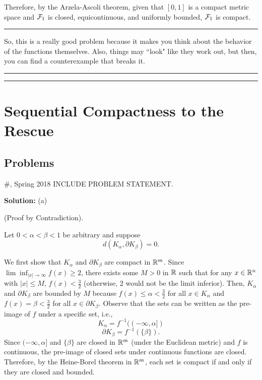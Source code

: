 \documentclass{article}
\begin{document}
	Therefore, by the Arzela-Ascoli theorem, given that $[0,1]$ is a compact metric space and $\mathcal F_1$ is closed, 
	equicontinuous, and uniformly bounded, $\mathcal F_1$ is compact. \\
	
\hrule

So, this is a really good problem because it makes you think about the behavior of the functions themselves. Also, things may ``look" like they work out, but then, you can find a counterexample that breaks it. \\

\hrule \vspace{2pt}
\hrule

\break

\section{Sequential Compactness to the Rescue}

\subsection{Problems}

\begin{problem}{\#, Spring 2018} INCLUDE PROBLEM STATEMENT.

\end{problem}

\textbf{Solution:} (a)

(Proof by Contradiction).

Let $0 < \alpha < \beta < 1$ be arbitrary and suppose 
\[d(K_\alpha,\partial K_\beta) = 0.\]

We first show that $K_\alpha$ and $\partial K_\beta$ are compact in $\mathbb R^m$. Since $\lim\inf_{|x|\to\infty} f(x) \geq 2$, there exists some $M>0$ in $\mathbb R$ such that for any $x\in \mathbb R^n$ with $|x|\leq M$, $f(x) < \frac{3}{2}$ (otherwise, 2 would not be the limit inferior). Then, $K_\alpha$ and $\partial K_\beta$ are bounded by $M$ because $f(x) \leq \alpha < \frac{3}{2}$ for all $x\in K_\alpha$ and $f(x) = \beta < \frac{3}{2}$ for all $x\in \partial K_\beta$. Observe that the sets can be written as the pre-image of $f$ under a specific set, i.e.,
\[K_\alpha = f^{-1}((-\infty, \alpha])\]
\[\partial K_\beta = f^{-1}(\{\beta\}).\]
Since $(-\infty, \alpha]$ and $\{\beta\}$ are closed in $\mathbb R^m$ (under the Euclidean metric) and $f$ is continuous, the pre-image of closed sets under continuous functions are closed. Therefore, by the Heine-Borel theorem in $\mathbb R^m$, each set is compact if and only if they are closed and bounded.
\end{document}
